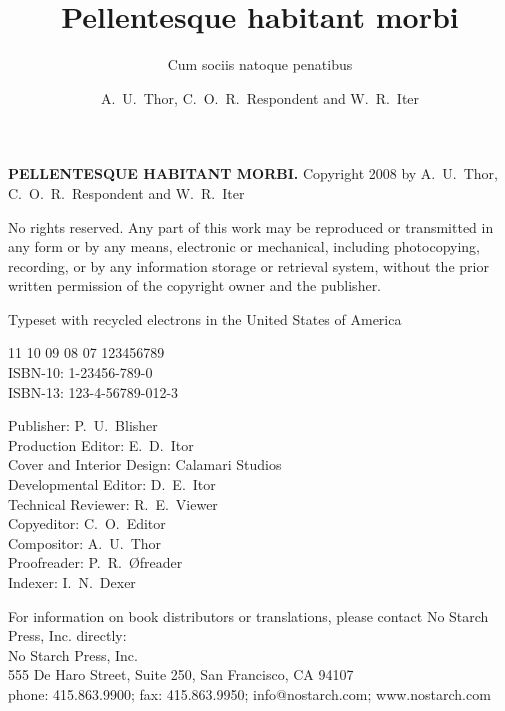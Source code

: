 \documentclass[cfonts]{nostarch}
\begin{document}
\frontmatter

\author{A.~U.~Thor, C.~O.~R.~Respondent and W.~R.~Iter}

\title{Pellentesque habitant morbi}

\subtitle{Cum sociis natoque penatibus}


\makehalftitle

\maketitle


\begin{copyrightpage}
  \textbf{\sffamily\MakeUppercase{Pellentesque habitant morbi.}}
  Copyright \textcopyright{} 2008 by A.~U.~Thor, C.~O.~R.~Respondent
  and W.~R.~Iter

  No rights reserved. Any part of this work may be reproduced or
  transmitted in any form or by any means, electronic or mechanical,
  including photocopying, recording, or by any information storage or
  retrieval system, without the prior written permission of the
  copyright owner and the publisher.

   Typeset
  with recycled electrons in the United States of America

11 10 09 08 07 \hspace{0.5in}  123456789\\
ISBN-10: 1-23456-789-0\\
ISBN-13: 123-4-56789-012-3

Publisher: P.~U.~Blisher\\
Production Editor: E.~D.~Itor\\
Cover and Interior Design: Calamari Studios\\
Developmental Editor: D.~E.~Itor\\
Technical Reviewer: R.~E.~Viewer\\
Copyeditor: C.~O.~Editor\\
Compositor: A.~U.~Thor\\
Proofreader: P.~R.~\O freader\\
Indexer: I.~N.~Dexer

For information on book distributors or translations, please contact
No Starch Press, Inc. directly: \\
No Starch Press, Inc.\\
555 De Haro Street, Suite 250, San Francisco, CA 94107\\
phone: 415.863.9900; fax: 415.863.9950; info@nostarch.com; www.nostarch.com\\


\end{copyrightpage}
\end{document}
